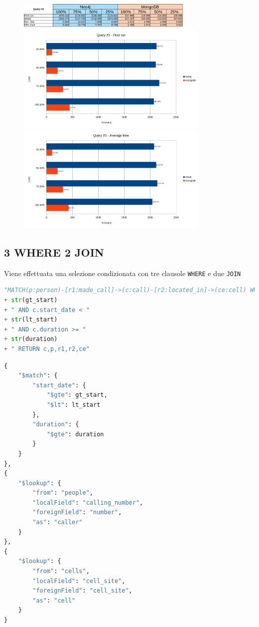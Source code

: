     \begin{figure}
        \includegraphics[width=320px, keepaspectratio, center]{query3.png}
        \label{fig:results3}
        \includegraphics[width=350px, keepaspectratio, center]{query3_fr.png}
        \label{fig:query3_fr}
        \includegraphics[width=350px, keepaspectratio, center]{query3_avg.png}
        \label{fig:query3_avg}
    \end{figure}

    \pagebreak
    \subsection{3 WHERE 2 JOIN}
    Viene effettuata una selezione condizionata con tre clausole \texttt{WHERE}
    e due \texttt{JOIN}

    \begin{lstlisting}[language=Python, caption=Neo4j]
"MATCH(p:person)-[r1:made_call]->(c:call)-[r2:located_in]->(ce:cell) WHERE c.start_date >" 
+ str(gt_start) 
+ " AND c.start_date < " 
+ str(lt_start) 
+ " AND c.duration >= " 
+ str(duration) 
+ " RETURN c,p,r1,r2,ce"
    \end{lstlisting}


    \begin{lstlisting}[language=Python, caption=MongoDB]
{
    "$match": {
        "start_date": {
            "$gte": gt_start,
            "$lt": lt_start
        },
        "duration": {
            "$gte": duration
        }
    }
},
{
    "$lookup": {
        "from": "people",
        "localField": "calling_number",
        "foreignField": "number",
        "as": "caller"
    }
},
{
    "$lookup": {
        "from": "cells",
        "localField": "cell_site",
        "foreignField": "cell_site",
        "as": "cell"
    }
}
    \end{lstlisting}

